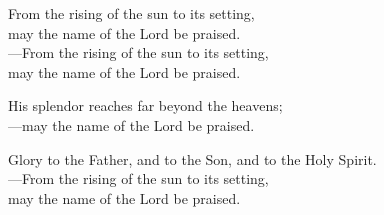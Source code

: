 \responsory

\noindent From the rising of the sun to its setting,\\
may the name of the Lord be praised.\\
{\color{red}---\thinspace}From the rising of the sun to its setting,\\
may the name of the Lord be praised.

\medskip\noindent His splendor reaches far beyond the heavens;\\
{\color{red}---\thinspace}may the name of the Lord be praised.

\medskip\noindent Glory to the Father, and to the Son, and to the Holy Spirit.\\
{\color{red}---\thinspace}From the rising of the sun to its setting,\\
may the name of the Lord be praised.